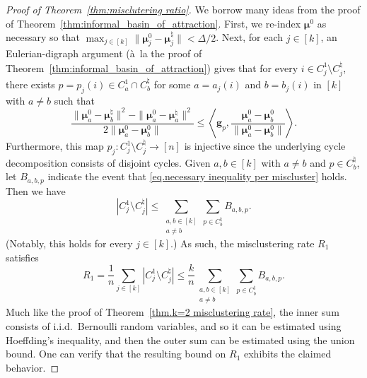 \documentclass{article}
\theoremstyle{plain}
\theoremstyle{definition}
\newcommand{\1}{\mathbf{1}}
\newcommand{\hmu}{\bm{\mu}^\natural}
\newcommand{\bmu}{\bm{\mu}}
\begin{document}
\begin{proof}[Proof of Theorem~\ref{thm:misclutering ratio}]
We borrow many ideas from the proof of Theorem~\ref{thm:informal_basin_of_attraction}.
First, we re-index $\bmu^0$ as necessary so that $\max_{j\in[k]}\|\bmu^0_j-\hmu_j\|<\Delta/2$.
Next, for each $j\in[k]$, an Eulerian-digraph argument (\`{a}~la the proof of Theorem~\ref{thm:informal_basin_of_attraction}) gives that for every $i\in C^1_j\setminus C^\natural_j$, there exists $p=p_j(i)\in C^1_a\cap C^\natural_b$ for some $a=a_j(i)$ and $b=b_j(i)$ in $[k]$ with $a\neq b$ such that
\begin{equation}
\label{eq.necessary inequality per miscluster}
\frac{\|\bmu^0_{a} - \hmu_{b}\|^2 - \|\bmu^0_{a} - \hmu_{a}\|^2 }{2\|\bmu^0_{a} - \bmu^0_{b}\|}
\leq\left\langle \bm{g}_{p} , \frac{\bmu^0_{a} - \bmu^0_{b}}{\|\bmu^0_{a} - \bmu^0_{b}\|}\right\rangle.
\end{equation}
Furthermore, this map $p_j\colon C^1_j\setminus C^\natural_j\to[n]$ is injective since the underlying cycle decomposition consists of disjoint cycles.
Given $a,b\in[k]$ with $a\neq b$ and $p\in C^\natural_b$, let $B_{a,b,p}$ indicate the event that \eqref{eq.necessary inequality per miscluster} holds.
Then we have
\[
|C^1_j\setminus C^\natural_j|
\leq \sum_{\substack{a,b\in[k]\\a\neq b}}\sum_{p\in C^\natural_b} B_{a,b,p}.
\]
(Notably, this holds for every $j\in[k]$.)
As such, the misclustering rate $R_1$ satisfies
\[
R_1
=\frac{1}{n}\sum_{j\in[k]}|C^1_j\setminus C^\natural_j|
\leq\frac{k}{n}\sum_{\substack{a,b\in[k]\\a\neq b}}\sum_{p\in C^\natural_b} B_{a,b,p}.
\]
Much like the proof of Theorem~\ref{thm.k=2 misclustering rate}, the inner sum consists of i.i.d.\ Bernoulli random variables, and so it can be estimated using Hoeffding's inequality, and then the outer sum can be estimated using the union bound.
One can verify that the resulting bound on $R_1$ exhibits the claimed behavior.
\end{proof}
\end{document}
